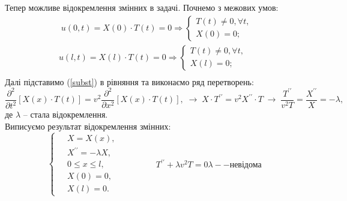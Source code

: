 \documentclass[a4paper, 12pt]{extreport}
\begin{document}
Тепер можливе відокремлення змінних в задачі. Почнемо з межових умов:
\begin{equation*}
    \begin{aligned}
        \;u(0,t) = X(0) \cdot T(t) = 0 \Rightarrow \left\{ \begin{aligned}
            T(t) \neq 0, \forall t, \\  X(0) = 0; 
        \end{aligned} \right.\\
        u(l,t) = X(l) \cdot T(t) = 0 \Rightarrow \left\{ \begin{aligned}
            T(t) \neq 0, \forall t, \\  X(l) = 0; 
        \end{aligned} \right.\\
    \end{aligned}
\end{equation*}
Далі підставимо (\ref{subst}) в рівняння та виконаємо ряд перетворень:
\begin{equation*}
    \frac{\partial^2}{\partial t^2}\left[X(x) \cdot T(t)\right] = v^2 \frac{\partial^2}{\partial x^2}\left[X(x) \cdot T(t)\right],
    \;\to\; 
    X \cdot T^{\prime\prime} = v^2 X^{\prime\prime} \cdot T 
    \;\to\; 
    \frac{T^{\prime\prime}}{v^2T} = \frac{X^{\prime\prime}}{X} = - \lambda,
\end{equation*}
де $\lambda$ -- стала відокремлення.\\
Виписуємо результат відокремлення змінних:
\begin{equation} \label{sepvar}
    \left\{ \begin{aligned}
        \;&X = X(x), \\  &X^{\prime\prime} = -\lambda X, \\ &0 \leq x \leq l, \\  &X(0) = 0, \\ &X(l) = 0. 
    \end{aligned} \right.
    \qquad\qquad
    \begin{aligned}
        T^{\prime\prime} + \lambda v^2 T = 0
        \lambda -- \text{невідома}
    \end{aligned}
\end{equation}
\end{document}
